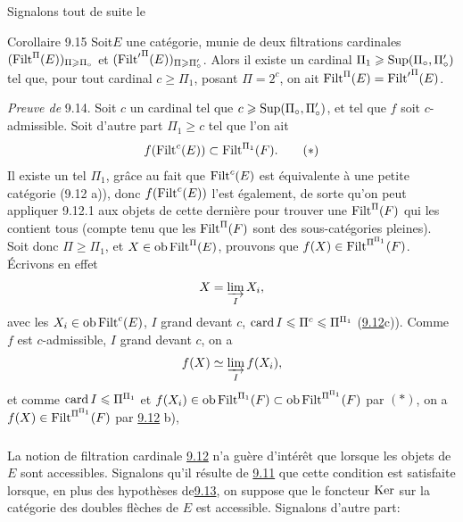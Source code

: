 \documentclass[10pt]{../fichiers-configuration-latex/smfart}
\begin{document}
Signalons tout de suite le

\begin{enonce*}{Corollaire 9.15}
Soit\pageoriginale $E$ une catégorie, munie de deux filtrations
cardinales\linebreak $(\operatorname{Filt}^{\Pi}(E))_{\Pi\geqslant\Pi_\circ}$ et
$({\Filt'}^{\Pi}(E))_{\Pi\geq %
\Pi'_\circ}$. Alors il existe un cardinal $\Pi_1\geqslant \operatorname{Sup}(\Pi_\circ,
\Pi'_\circ)$ tel que, pour tout cardinal $c\geq\Pi_1$, posant
$\Pi=2^c$, on ait $\operatorname{Filt}^{\Pi}(E)={\operatorname{Filt}'}^{\Pi}(E)$.
\end{enonce*}

\noindent \emph{Preuve de} 9.14. Soit $c$ un cardinal tel que
$c\geqslant\operatorname{Sup}(\Pi_\circ, \Pi'_\circ)$, et tel que $f$ soit
$c$-admissible. Soit d'autre part $\Pi_1\geq c$ tel que l'on ait
\begin{equation}
f(\operatorname{Filt}^c(E))\subset \operatorname{Filt}^{\Pi_1}(F){}.\tag{$\ast$}
\end{equation}
Il existe un tel $\Pi_1$, grâce au fait que $\operatorname{Filt}^c(E)$ est
équivalente à une petite catégorie (9.12 a)), donc $f(\operatorname{Filt}^c(E))$
l'est également, de sorte qu'on peut appliquer 9.12.1 aux objets de
cette dernière pour trouver une $\operatorname{Filt}^{\Pi}(F)$ qui les contient %
tous (compte tenu que les $\operatorname{Filt}^{\Pi}(F)$ sont des sous-catégories
pleines). Soit donc $\Pi\geq \Pi_1$, et $X\in \operatorname{ob} \operatorname{Filt}^{\Pi}(E)$,
prouvons que $f(X)\in \operatorname{Filt}^{\Pi^{\Pi_1}}(F)$. Écrivons en effet
$$
X=\varinjlim_I X_i{},
$$
avec les $X_i\in \operatorname{ob} \operatorname{Filt}^c(E)$, $I$ grand devant $c$, $\operatorname{card} I\leqslant
\Pi^c\leqslant \Pi^{\Pi_1}$ (\hyperref[I.def9.12]{9.12}c)). Comme $f$ est $c$-admissible, $I$
grand devant $c$, on a
$$
f(X)\simeq \varinjlim_I f(X_i){},
$$
et comme $\operatorname{card} I\leqslant \Pi^{\Pi_1}$ et $f(X_i)\in \operatorname{ob}
\operatorname{Filt}^{\Pi_1}(F)\subset \operatorname{ob} \operatorname{Filt}^{\Pi^{\Pi_1}}(F)$ par $(\ast)$, on
a $f(X)\in \operatorname{Filt}^{\Pi^{\Pi_1}}(F)$ par \hyperref[I.def9.12]{9.12} b), \cqfd

\setcounter{subsection}{15} \setcounter{subsubsection}{0}
\subsubsection{}
La notion de filtration cardinale \hyperref[I.def9.12]{9.12} n'a guère
d'intérêt que lorsque les objets de $E$ sont accessibles. Signalons
qu'il résulte de \hyperref[I.prop9.11]{9.11} que cette condition est satisfaite
lorsque, en plus des hypothèses de\pageoriginale \hyperref[I.prop9.13]{9.13},
on suppose que le foncteur $\operatorname{Ker}$ sur la catégorie des doubles
flèches de $E$ est accessible. Signalons d'autre part:
\end{document}
